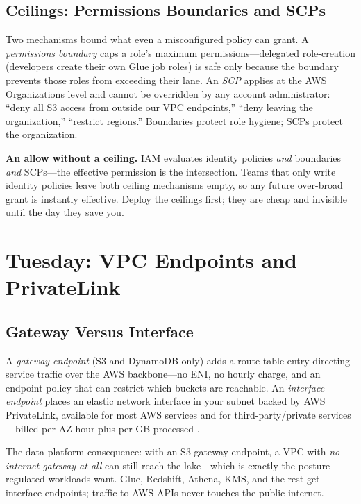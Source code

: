\subsection{Ceilings: Permissions Boundaries and SCPs}
Two mechanisms bound what even a misconfigured policy can grant. A \emph{permissions boundary} caps a role's maximum permissions---delegated role-creation (developers create their own Glue job roles) is safe only because the boundary prevents those roles from exceeding their lane. An \emph{SCP} applies at the AWS Organizations level and cannot be overridden by any account administrator: ``deny all S3 access from outside our VPC endpoints,'' ``deny leaving the organization,'' ``restrict regions.'' Boundaries protect role hygiene; SCPs protect the organization.

\begin{pitfall}
\textbf{An allow without a ceiling.} IAM evaluates identity policies \emph{and} boundaries \emph{and} SCPs---the effective permission is the intersection. Teams that only write identity policies leave both ceiling mechanisms empty, so any future over-broad grant is instantly effective. Deploy the ceilings first; they are cheap and invisible until the day they save you.
\end{pitfall}

\section{Tuesday: VPC Endpoints and PrivateLink}
\subsection{Gateway Versus Interface}
A \emph{gateway endpoint} (S3 and DynamoDB only) adds a route-table entry directing service traffic over the AWS backbone---no ENI, no hourly charge, and an endpoint policy that can restrict which buckets are reachable. An \emph{interface endpoint} places an elastic network interface in your subnet backed by AWS PrivateLink, available for most AWS services and for third-party/private services---billed per AZ-hour plus per-GB processed \cite{awsPrivateLinkDocs}.

The data-platform consequence: with an S3 gateway endpoint, a VPC with \emph{no internet gateway at all} can still reach the lake---which is exactly the posture regulated workloads want. Glue, Redshift, Athena, KMS, and the rest get interface endpoints; traffic to AWS APIs never touches the public internet.

